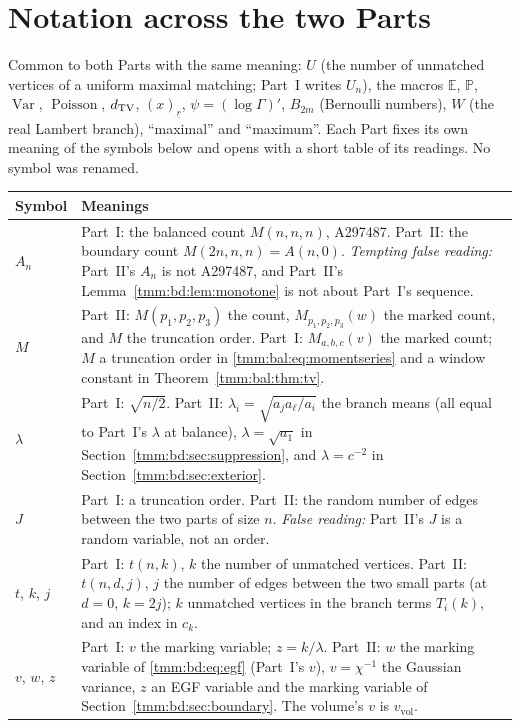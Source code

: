 \documentclass[11pt,letterpaper]{article}
\theoremstyle{remark}\newtheorem{remark}[theorem]{Remark}
\newcommand{\E}{\mathbb E}\newcommand{\Pp}{\mathbb P}
\newcommand{\Var}{\operatorname{Var}}\newcommand{\Poi}{\operatorname{Poisson}}
\newcommand{\fall}[2]{(#1)_{\underline{#2}}}
\newcommand{\vol}{\mathrm{vol}}
\begin{document}
\section*{Notation across the two Parts}\label{tmm:sec:notation}
Common to both Parts with the same meaning: $U$ (the number of unmatched vertices of a uniform maximal matching; Part~I writes $U_n$), the macros $\E$, $\Pp$, $\Var$, $\Poi$, $d_{\mathrm{TV}}$, $\fall{x}{r}$, $\psi=(\log\Gamma)'$, $B_{2m}$ (Bernoulli numbers), $W$ (the real Lambert branch), ``maximal'' and ``maximum''. Each Part fixes its own meaning of the symbols below and opens with a short table of its readings. No symbol was renamed.
\begingroup\small
\renewcommand{\theHtable}{notation.\arabic{table}}
\begin{longtable}{@{}>{\raggedright\arraybackslash}p{} >{\raggedright\arraybackslash}p{}@{}}
\toprule
Symbol & Meanings\\
\midrule
\endhead
$A_n$ & Part~I: the balanced count $M(n,n,n)$, A297487. Part~II: the boundary count $M(2n,n,n)=A(n,0)$. \emph{Tempting false reading:} Part~II's $A_n$ is not A297487, and Part~II's Lemma~\ref{tmm:bd:lem:monotone} is not about Part~I's sequence.\\
$M$ & Part~II: $M(p_1,p_2,p_3)$ the count, $M_{p_1,p_2,p_3}(w)$ the marked count, and $M$ the truncation order. Part~I: $M_{a,b,c}(v)$ the marked count; $M$ a truncation order in \eqref{tmm:bal:eq:momentseries} and a window constant in Theorem~\ref{tmm:bal:thm:tv}.\\
$\lambda$ & Part~I: $\sqrt{n/2}$. Part~II: $\lambda_i=\sqrt{a_ja_\ell/a_i}$ the branch means (all equal to Part~I's $\lambda$ at balance), $\lambda=\sqrt{a_1}$ in Section~\ref{tmm:bd:sec:suppression}, and $\lambda=c^{-2}$ in Section~\ref{tmm:bd:sec:exterior}.\\
$J$ & Part~I: a truncation order. Part~II: the random number of edges between the two parts of size $n$. \emph{False reading:} Part~II's $J$ is a random variable, not an order.\\
$t$, $k$, $j$ & Part~I: $t(n,k)$, $k$ the number of unmatched vertices. Part~II: $t(n,d,j)$, $j$ the number of edges between the two small parts (at $d=0$, $k=2j$); $k$ unmatched vertices in the branch terms $T_i(k)$, and an index in $c_k$.\\
$v$, $w$, $z$ & Part~I: $v$ the marking variable; $z=k/\lambda$. Part~II: $w$ the marking variable of \eqref{tmm:bd:eq:egf} (Part~I's $v$), $v=\chi^{-1}$ the Gaussian variance, $z$ an EGF variable and the marking variable of Section~\ref{tmm:bd:sec:boundary}. The volume's $v$ is $v_\vol$.\\

\end{longtable}
\end{document}
